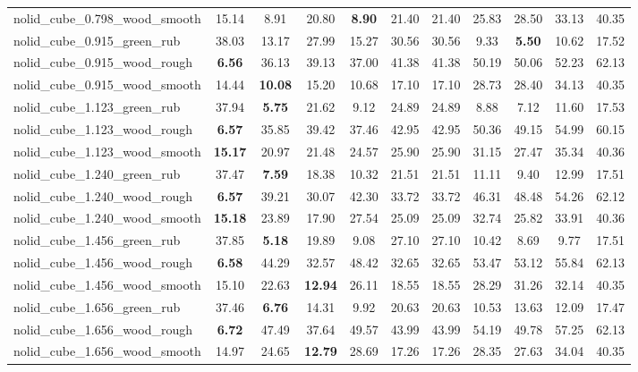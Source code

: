 \begin{table}[H]
{\begin{tabular}{l cccccccccc}
        nolid\_cube\_0.798\_wood\_smooth & 15.14 & 8.91 & 20.80 & \textbf{8.90} & 21.40 & 21.40 & 25.83 & 28.50 & 33.13 & 40.35 \\
        nolid\_cube\_0.915\_green\_rub & 38.03 & 13.17 & 27.99 & 15.27 & 30.56 & 30.56 & 9.33 & \textbf{5.50} & 10.62 & 17.52 \\
        nolid\_cube\_0.915\_wood\_rough & \textbf{6.56} & 36.13 & 39.13 & 37.00 & 41.38 & 41.38 & 50.19 & 50.06 & 52.23 & 62.13 \\
        nolid\_cube\_0.915\_wood\_smooth & 14.44 & \textbf{10.08} & 15.20 & 10.68 & 17.10 & 17.10 & 28.73 & 28.40 & 34.13 & 40.35 \\
        nolid\_cube\_1.123\_green\_rub & 37.94 & \textbf{5.75} & 21.62 & 9.12 & 24.89 & 24.89 & 8.88 & 7.12 & 11.60 & 17.53 \\
        nolid\_cube\_1.123\_wood\_rough & \textbf{6.57} & 35.85 & 39.42 & 37.46 & 42.95 & 42.95 & 50.36 & 49.15 & 54.99 & 60.15 \\
        nolid\_cube\_1.123\_wood\_smooth & \textbf{15.17} & 20.97 & 21.48 & 24.57 & 25.90 & 25.90 & 31.15 & 27.47 & 35.34 & 40.36 \\
        nolid\_cube\_1.240\_green\_rub & 37.47 & \textbf{7.59} & 18.38 & 10.32 & 21.51 & 21.51 & 11.11 & 9.40 & 12.99 & 17.51 \\
        nolid\_cube\_1.240\_wood\_rough & \textbf{6.57} & 39.21 & 30.07 & 42.30 & 33.72 & 33.72 & 46.31 & 48.48 & 54.26 & 62.12 \\
        nolid\_cube\_1.240\_wood\_smooth & \textbf{15.18} & 23.89 & 17.90 & 27.54 & 25.09 & 25.09 & 32.74 & 25.82 & 33.91 & 40.36 \\
        nolid\_cube\_1.456\_green\_rub & 37.85 & \textbf{5.18} & 19.89 & 9.08 & 27.10 & 27.10 & 10.42 & 8.69 & 9.77 & 17.51 \\
        nolid\_cube\_1.456\_wood\_rough & \textbf{6.58} & 44.29 & 32.57 & 48.42 & 32.65 & 32.65 & 53.47 & 53.12 & 55.84 & 62.13 \\
        nolid\_cube\_1.456\_wood\_smooth & 15.10 & 22.63 & \textbf{12.94} & 26.11 & 18.55 & 18.55 & 28.29 & 31.26 & 32.14 & 40.35 \\
        nolid\_cube\_1.656\_green\_rub & 37.46 & \textbf{6.76} & 14.31 & 9.92 & 20.63 & 20.63 & 10.53 & 13.63 & 12.09 & 17.47 \\
        nolid\_cube\_1.656\_wood\_rough & \textbf{6.72} & 47.49 & 37.64 & 49.57 & 43.99 & 43.99 & 54.19 & 49.78 & 57.25 & 62.13 \\
        nolid\_cube\_1.656\_wood\_smooth & 14.97 & 24.65 & \textbf{12.79} & 28.69 & 17.26 & 17.26 & 28.35 & 27.63 & 34.04 & 40.35 \\

\end{tabular}}
\end{table}
